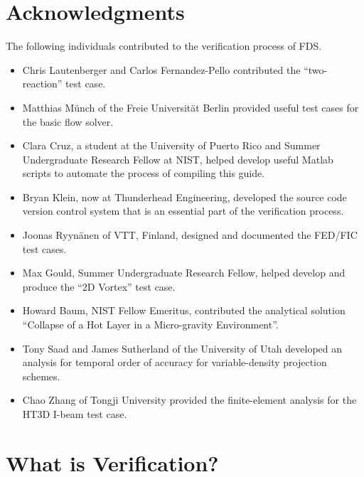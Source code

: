 \documentclass[11pt]{book}
\begin{document}
\chapter{Acknowledgments}

\label{acksection}

The following individuals contributed to the verification process of FDS.
\begin{itemize}
\item Chris Lautenberger and Carlos Fernandez-Pello contributed the ``two-reaction'' test case.
\item Matthias M\"{u}nch of the Freie Universit\"{a}t Berlin provided useful test cases for the basic flow solver.
\item Clara Cruz, a student at the University of Puerto Rico and Summer Undergraduate Research Fellow at NIST, helped develop useful Matlab scripts to automate the process of compiling this guide.
\item Bryan Klein, now at Thunderhead Engineering, developed the source code version control system that is an essential part of the verification process.
\item Joonas Ryyn\"{a}nen of VTT, Finland, designed and documented the FED/FIC test cases.
\item Max Gould, Summer Undergraduate Research Fellow, helped develop and produce the ``2D Vortex'' test case.
\item Howard Baum, NIST Fellow Emeritus, contributed the analytical solution ``Collapse of a Hot Layer in a Micro-gravity Environment''.
\item Tony Saad and James Sutherland of the University of Utah developed an analysis for temporal order of accuracy for variable-density projection schemes.
\item Chao Zhang of Tongji University provided the finite-element analysis for the HT3D I-beam test case.
\end{itemize}


\cleardoublepage
{}
{}
\tableofcontents

\cleardoublepage
{}
{}
\listoffigures

\cleardoublepage
{}
{}
\listoftables

\mainmatter


\chapter{What is Verification?}
\end{document}
